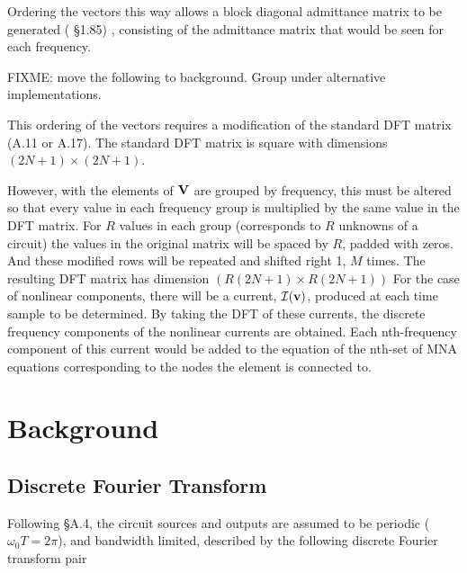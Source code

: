 \documentclass[12pt,journal,compsoc]{../ieeepaper/IEEEtran}
\begin{document}
Ordering the vectors this way allows a block diagonal admittance matrix to be generated (\citep{giannini2004NonlinearMicrowaveCircuitDesign}
 \S 1.85)
, consisting of the admittance matrix that would be seen for each frequency.

FIXME: move the following to background.  Group under alternative implementations.

This ordering of the vectors requires a modification of the standard DFT matrix (A.11 or A.17).
The standard DFT matrix is square with dimensions \( (2 N + 1 ) \times (2 N + 1 ) \).

However, with the elements of \( \mathbf{V} \) are grouped by frequency,
this must be altered so that every value in each frequency group is multiplied by the same value in the DFT matrix.
For \( R \) values in each group (corresponds to \( R \) unknowns of a circuit) the values in the original 
matrix will be spaced by \( R \), padded with zeros.
And these modified rows will be repeated and shifted
right 1, \( M \) times.
The resulting DFT matrix has dimension \( ( R (2 N + 1 ) \times R (2 N + 1) ) \)
For the case of nonlinear components, there will be a current, \( \mathcal{I}(\mathbf{v}) \), produced at each time sample to be determined.
By taking the DFT of these currents, the discrete frequency
components of the nonlinear currents are obtained.
Each nth-frequency component of this current would be added
to the equation of the nth-set of MNA equations corresponding to the nodes the element is connected
to.

%
% 

\section{Background}
\subsection{Discrete Fourier Transform}

Following \citep{giannini2004NonlinearMicrowaveCircuitDesign} \S A.4, the circuit sources and outputs are assumed to be periodic (\( \omega_0 T = 2 \pi \)), and bandwidth limited, described by the following discrete Fourier transform pair
\end{document}
